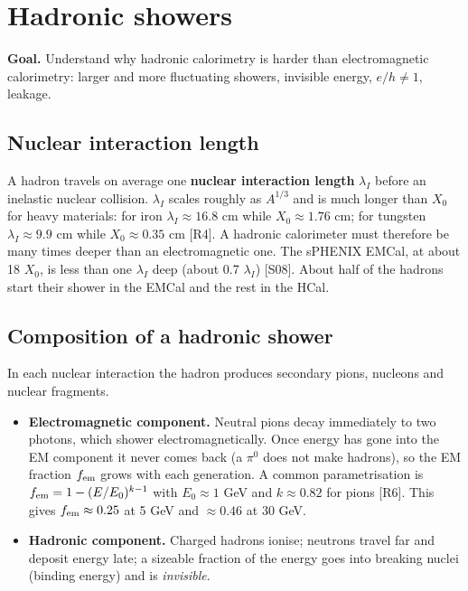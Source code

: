 \documentclass[11pt,letterpaper]{article}
\newcommand{\goal}[1]{\par\noindent\textbf{Goal.} #1\par\smallskip}
\begin{document}
\section{Hadronic showers}\label{sec:had}
\goal{Understand why hadronic calorimetry is harder than electromagnetic calorimetry: larger and more fluctuating showers, invisible energy, $e/h\neq1$, leakage.}

\subsection{Nuclear interaction length}
A hadron travels on average one \textbf{nuclear interaction length} $\lambda_I$ before an inelastic nuclear collision.
$\lambda_I$ scales roughly as $A^{1/3}$ and is much longer than $X_0$ for heavy materials: for iron $\lambda_I\approx16.8$ cm while $X_0\approx1.76$ cm; for tungsten $\lambda_I\approx9.9$ cm while $X_0\approx0.35$ cm [R4].
A hadronic calorimeter must therefore be many times deeper than an electromagnetic one.
The sPHENIX EMCal, at about 18 $X_0$, is less than one $\lambda_I$ deep (about 0.7 $\lambda_I$) [S08].
About half of the hadrons start their shower in the EMCal and the rest in the HCal.

\subsection{Composition of a hadronic shower}
In each nuclear interaction the hadron produces secondary pions, nucleons and nuclear fragments.
\begin{itemize}
\item \textbf{Electromagnetic component.} Neutral pions decay immediately to two photons, which shower electromagnetically. Once energy has gone into the EM component it never comes back (a $\pi^0$ does not make hadrons), so the EM fraction $f_{\rm em}$ grows with each generation. A common parametrisation is $f_{\rm em}=1-(E/E_0)^{k-1}$ with $E_0\approx1$ GeV and $k\approx0.82$ for pions [R6]. This gives $f_{\rm em}\approx0.25$ at 5 GeV and $\approx0.46$ at 30 GeV.
\item \textbf{Hadronic component.} Charged hadrons ionise; neutrons travel far and deposit energy late; a sizeable fraction of the energy goes into breaking nuclei (binding energy) and is \emph{invisible}.
\end{itemize}
\end{document}
